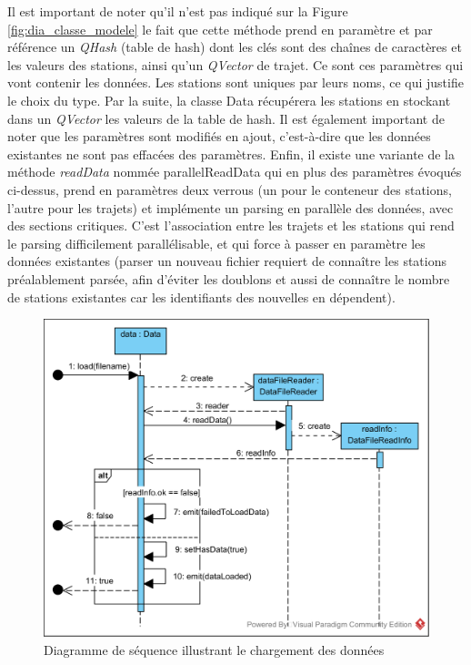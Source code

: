 \documentclass[12pt]{article}
\begin{document}
		Il est important de noter qu’il n’est pas indiqué sur la Figure \ref{fig:dia_classe_modele} le fait que cette méthode prend en paramètre et par référence un \textit{QHash} (table de hash) dont les clés sont des chaînes de caractères et les valeurs des stations, ainsi qu’un \textit{QVector} de trajet. Ce sont ces paramètres qui vont contenir les données. Les stations sont uniques par leurs noms, ce qui justifie le choix du type. Par la suite, la classe Data récupérera les stations en stockant dans un \textit{QVector} les valeurs de la table de hash. Il est également important de noter que les paramètres sont modifiés en ajout, c’est-à-dire que les données existantes ne sont pas effacées des paramètres. Enfin, il existe une variante de la méthode \textit{readData} nommée parallelReadData qui en plus des paramètres évoqués ci-dessus, prend en paramètres deux verrous (un pour le conteneur des stations, l’autre pour les trajets) et implémente un parsing en parallèle des données, avec des sections critiques. C’est l’association entre les trajets et les stations qui rend le parsing difficilement parallélisable, et qui force à passer en paramètre les données existantes (parser un nouveau fichier requiert de connaître les stations préalablement parsée, afin d’éviter les doublons et aussi de connaître le nombre de stations existantes car les identifiants des nouvelles en dépendent).\\
		
		\begin{figure}[!h]
		\begin{center}
		\includegraphics[scale=1]{dia_sequence_loadData.png}
		\caption{Diagramme de séquence illustrant le chargement des données}
		\label{fig:dia_seq_chargement_donnees}
		\end{center}
		\end{figure}
	
\end{document}
